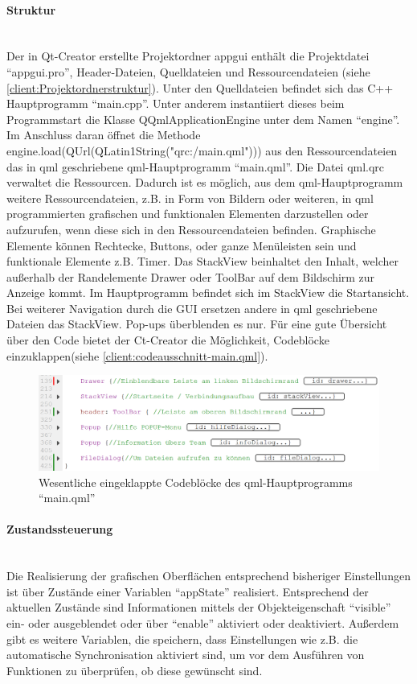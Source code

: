 \paragraph{Struktur}$\;$\\
Der in Qt-Creator erstellte Projektordner app\textunderscore gui enthält die Projektdatei "`app\textunderscore gui.pro"', Header-Dateien, Quelldateien und Ressourcendateien (siehe \autoref{client:Projektordnerstruktur}). Unter den Quelldateien befindet sich das C++ Hauptprogramm "`main.cpp"'. Unter anderem instantiiert dieses beim Programmstart die Klasse QQmlApplicationEngine unter dem Namen "`engine"'. Im Anschluss daran öffnet die Methode engine.load(QUrl(QLatin1String("qrc:/main.qml"))) aus den Ressourcendateien das in qml geschriebene qml-Hauptprogramm "`main.qml"'. Die Datei qml.qrc verwaltet die Ressourcen. Dadurch ist es möglich, aus dem qml-Hauptprogramm weitere Ressourcendateien, z.B. in Form von Bildern oder weiteren, in qml programmierten grafischen und funktionalen Elementen darzustellen oder aufzurufen, wenn diese sich in den Ressourcendateien befinden. Graphische Elemente können Rechtecke, Buttons, oder ganze Menüleisten sein und funktionale Elemente z.B. Timer.
Das StackView beinhaltet den Inhalt, welcher außerhalb der Randelemente Drawer oder ToolBar auf dem Bildschirm zur Anzeige kommt. Im Hauptprogramm befindet sich im StackView die Startansicht. Bei weiterer Navigation durch die GUI ersetzen andere in qml geschriebene Dateien das StackView. Pop-ups überblenden es nur.
Für eine gute Übersicht über den Code bietet der Ct-Creator die Möglichkeit, Codebl\"ocke einzuklappen(siehe \autoref{client:codeausschnitt-main.qml}).

\begin{figure}[ht!]
	\centering
	\includegraphics[scale=0.8]{GUI/Bilder/qml-main-Codeausschnitt.PNG}
	\caption{Wesentliche eingeklappte Codebl\"ocke des qml-Hauptprogramms "`main.qml"' {\tiny}}
	\label{client:codeausschnitt-main.qml}
\end{figure}

\paragraph{Zustandssteuerung}$\;$\\
Die Realisierung der grafischen Oberflächen entsprechend bisheriger Einstellungen ist über Zustände einer Variablen "`appState"' realisiert. Entsprechend der aktuellen Zustände sind Informationen mittels der Objekteigenschaft "`visible"' ein- oder ausgeblendet oder über "`enable"' aktiviert oder deaktiviert. Außerdem gibt es weitere Variablen, die speichern, dass Einstellungen wie z.B. die automatische Synchronisation aktiviert sind, um vor dem Ausführen von Funktionen zu überprüfen, ob diese gewünscht sind.

